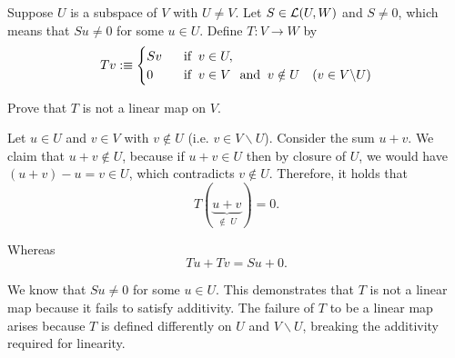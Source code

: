 \begin{xrcs}
  Suppose $U$ is a subspace of $V$ with $U \neq V$. Let $S \in \mathcal{L}(U, W)$ and $S \neq 0$, which means that $Su \neq 0$ for some $u \in U$. Define $T: V \to W$ by
  \begin{equation}
    Tv :\equiv
    \begin{cases}
      Sv & \;\;\, \text{if}\;\; v \in U, \\
      0  & \;\;\, \text{if}\;\; v \in V \;\;\, \text{and}\;\; v \notin U \quad (v \in V \backslash U)
    \end{cases}
  \end{equation}

  Prove that $T$ is not a linear map on $V$.

  \begin{xprf}
    Let $u \in U$ and $v \in V$ with $v \notin U$ (i.e. $v \in V \backslash U$). Consider the sum $u + v$. We claim that $u+v \notin U$, because if $u+v \in U$ then by closure of $U$, we would have $(u+v)-u = v \in U$, which contradicts $v \notin U$. Therefore, it holds that
    \begin{equation}
      T(\underbrace{u+v}_{\notin \; U}) = 0.
    \end{equation}

    Whereas
    \begin{equation}
      Tu + Tv = Su + 0.
    \end{equation}

    We know that $Su \neq 0$ for some $u \in U$. This demonstrates that $T$ is not a linear map because it fails to satisfy additivity. The failure of $T$ to be a linear map arises because $T$
     is defined differently on $U$ and $V \backslash U$, breaking the additivity required for linearity.
  \end{xprf}
\end{xrcs}

